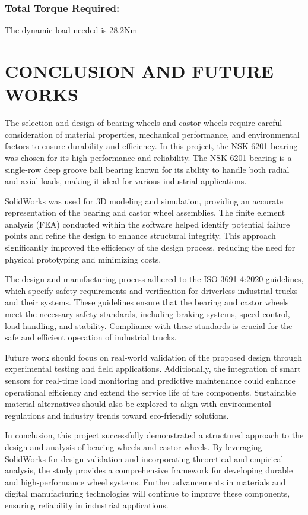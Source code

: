 \documentclass[../../main]{subfiles}
\begin{document}
\subsubsection{Total Torque Required:}

The dynamic load needed is 28.2Nm

\section{CONCLUSION AND FUTURE WORKS}

The selection and design of bearing wheels and castor wheels require
careful consideration of material properties, mechanical performance,
and environmental factors to ensure durability and efficiency. In this
project, the NSK 6201 bearing was chosen for its high performance and
reliability. The NSK 6201 bearing is a single-row deep groove ball
bearing known for its ability to handle both radial and axial loads,
making it ideal for various industrial applications.

SolidWorks was used for 3D modeling and simulation, providing an
accurate representation of the bearing and castor wheel assemblies. The
finite element analysis (FEA) conducted within the software helped
identify potential failure points and refine the design to enhance
structural integrity. This approach significantly improved the
efficiency of the design process, reducing the need for physical
prototyping and minimizing costs.

The design and manufacturing process adhered to the ISO 3691-4:2020
guidelines, which specify safety requirements and verification for
driverless industrial trucks and their systems. These guidelines ensure
that the bearing and castor wheels meet the necessary safety standards,
including braking systems, speed control, load handling, and stability.
Compliance with these standards is crucial for the safe and efficient
operation of industrial trucks.

Future work should focus on real-world validation of the proposed design
through experimental testing and field applications. Additionally, the
integration of smart sensors for real-time load monitoring and
predictive maintenance could enhance operational efficiency and extend
the service life of the components. Sustainable material alternatives
should also be explored to align with environmental regulations and
industry trends toward eco-friendly solutions.

In conclusion, this project successfully demonstrated a structured
approach to the design and analysis of bearing wheels and castor wheels.
By leveraging SolidWorks for design validation and incorporating
theoretical and empirical analysis, the study provides a comprehensive
framework for developing durable and high-performance wheel systems.
Further advancements in materials and digital manufacturing technologies
will continue to improve these components, ensuring reliability in
industrial applications.
\end{document}
